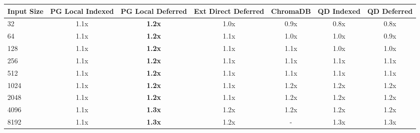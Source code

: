 \begin{tabular}{lcccccc}
\toprule
\textbf{Input Size} & \textbf{PG Local Indexed} & \textbf{PG Local Deferred} & \textbf{Ext Direct Deferred} & \textbf{ChromaDB} & \textbf{QD Indexed} & \textbf{QD Deferred} \\
\midrule
32 & 1.1x & \textbf{1.2x} & 1.0x & 0.9x & 0.8x & 0.8x \\
64 & 1.1x & \textbf{1.2x} & 1.1x & 1.0x & 1.0x & 0.9x \\
128 & 1.1x & \textbf{1.2x} & 1.1x & 1.1x & 1.0x & 1.0x \\
256 & 1.1x & \textbf{1.2x} & 1.1x & 1.1x & 1.1x & 1.1x \\
512 & 1.1x & \textbf{1.2x} & 1.1x & 1.1x & 1.1x & 1.1x \\
1024 & 1.1x & \textbf{1.2x} & 1.1x & 1.2x & 1.2x & 1.2x \\
2048 & 1.1x & \textbf{1.2x} & 1.1x & 1.2x & 1.2x & 1.2x \\
4096 & 1.1x & \textbf{1.3x} & 1.2x & 1.2x & 1.2x & 1.2x \\
8192 & 1.1x & \textbf{1.3x} & 1.2x & - & 1.3x & 1.3x \\
\bottomrule
\end{tabular}
